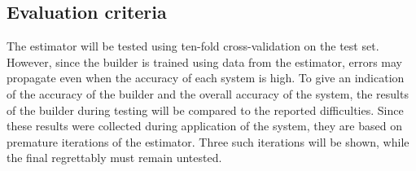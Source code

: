 \documentclass[a4paper]{article}
\begin{document}
\begin{multicols*}{2}
\subsection{Evaluation criteria}
The estimator will be tested using ten-fold cross-validation on the test set. However, since the builder is trained using data from the estimator, errors may propagate even when the accuracy of each system is high. To give an indication of the accuracy of the builder and the overall accuracy of the system, the results of the builder during testing will be compared to the reported difficulties. Since these results were collected during application of the system, they are based on premature iterations of the estimator. Three such iterations will be shown, while the final regrettably must remain untested.




\end{multicols*}
\end{document}
